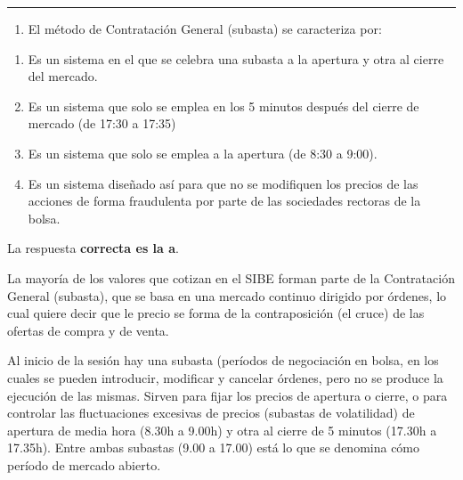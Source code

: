 \documentclass[
  letterpaper,
  DIV=11,
  numbers=noendperiod]{scrreprt}
\providecommand{\tightlist}{%
  \setlength{\itemsep}{0pt}\setlength{\parskip}{0pt}}\usepackage{longtable,booktabs,array}
\begin{document}
\begin{center}\rule{0.5\linewidth}{0.5pt}\end{center}

\begin{enumerate}
\def\labelenumi{\arabic{enumi}.}
\setcounter{enumi}{5}
\tightlist
\item
  El método de Contratación General (subasta) se caracteriza por:
\end{enumerate}

\begin{enumerate}
\def\labelenumi{\alph{enumi})}
\item
  Es un sistema en el que se celebra una subasta a la apertura y otra al
  cierre del mercado.
\item
  Es un sistema que solo se emplea en los 5 minutos después del cierre
  de mercado (de 17:30 a 17:35)
\item
  Es un sistema que solo se emplea a la apertura (de 8:30 a 9:00).
\item
  Es un sistema diseñado así para que no se modifiquen los precios de
  las acciones de forma fraudulenta por parte de las sociedades rectoras
  de la bolsa.
\end{enumerate}

\begin{tcolorbox}[enhanced jigsaw, left=2mm, opacityback=0, colback=white, breakable, arc=.35mm, bottomrule=.15mm, rightrule=.15mm, toprule=.15mm, leftrule=.75mm, colframe=quarto-callout-tip-color-frame]
\begin{minipage}[t]{5.5mm}
\textcolor{quarto-callout-tip-color}{\faLightbulb}
\end{minipage}%
\begin{minipage}[t]{\textwidth - 5.5mm}

La respuesta \textbf{correcta es la a}.

La mayoría de los valores que cotizan en el SIBE forman parte de la
Contratación General (subasta), que se basa en una mercado continuo
dirigido por órdenes, lo cual quiere decir que le precio se forma de la
contraposición (el cruce) de las ofertas de compra y de venta.

Al inicio de la sesión hay una subasta (períodos de negociación en
bolsa, en los cuales se pueden introducir, modificar y cancelar órdenes,
pero no se produce la ejecución de las mismas. Sirven para fijar los
precios de apertura o cierre, o para controlar las fluctuaciones
excesivas de precios (subastas de volatilidad) de apertura de media hora
(8.30h a 9.00h) y otra al cierre de 5 minutos (17.30h a 17.35h). Entre
ambas subastas (9.00 a 17.00) está lo que se denomina cómo período de
mercado abierto.

\end{minipage}%
\end{tcolorbox}
\end{document}
